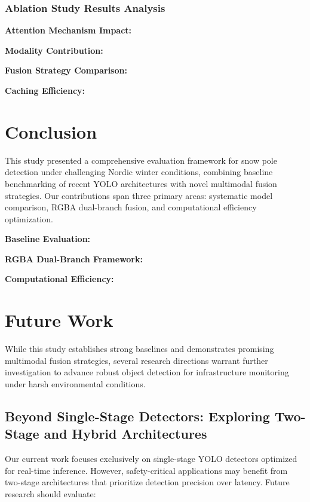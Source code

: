 \documentclass[runningheads]{llncs}
\begin{document}
\subsubsection{Ablation Study Results Analysis}

\textbf{Attention Mechanism Impact:}


\textbf{Modality Contribution:}

\textbf{Fusion Strategy Comparison:} 

\textbf{Caching Efficiency:}

\section{Conclusion}

This study presented a comprehensive evaluation framework for snow pole detection under challenging Nordic winter conditions, combining baseline benchmarking of recent YOLO architectures with novel multimodal fusion strategies. Our contributions span three primary areas: systematic model comparison, RGBA dual-branch fusion, and computational efficiency optimization.

\textbf{Baseline Evaluation:} 

\textbf{RGBA Dual-Branch Framework:}

\textbf{Computational Efficiency:} 


\section{Future Work}

While this study establishes strong baselines and demonstrates promising multimodal fusion strategies, several research directions warrant further investigation to advance robust object detection for infrastructure monitoring under harsh environmental conditions.

\subsection{Beyond Single-Stage Detectors: Exploring Two-Stage and Hybrid Architectures}

Our current work focuses exclusively on single-stage YOLO detectors optimized for real-time inference. However, safety-critical applications may benefit from two-stage architectures that prioritize detection precision over latency. Future research should evaluate:
\end{document}
